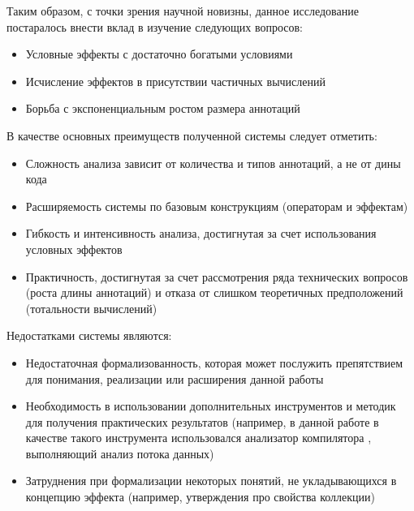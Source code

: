 Таким образом, с точки зрения научной новизны, данное исследование постаралось внести вклад в изучение следующих вопросов:

\begin{itemize}
	\item Условные эффекты с достаточно богатыми условиями
	
	\item Исчисление эффектов в присутствии частичных вычислений
	
	\item Борьба с экспоненциальным ростом размера аннотаций
\end{itemize}


В качестве основных преимуществ полученной системы следует отметить:

\begin{itemize}
	\item Сложность анализа зависит от количества и типов аннотаций, а не от дины кода
	
	\item Расширяемость системы по базовым конструкциям (операторам и эффектам)
	
	\item Гибкость и интенсивность анализа, достигнутая за счет использования условных эффектов
	
	\item Практичность, достигнутая за счет рассмотрения ряда технических вопросов (роста длины аннотаций) и отказа от слишком теоретичных предположений (тотальности вычислений)
\end{itemize}

Недостатками системы являются: 

\begin{itemize}
	\item Недостаточная формализованность, которая может послужить препятствием для понимания, реализации или расширения данной работы
	
	\item Необходимость в использовании дополнительных инструментов и методик для получения практических результатов (например, в данной работе в качестве такого инструмента использовался анализатор компилятора , выполняющий анализ потока данных)
	
	\item Затруднения при формализации некоторых понятий, не укладывающихся в концепцию эффекта (например, утверждения про свойства коллекции)
\end{itemize}
   
